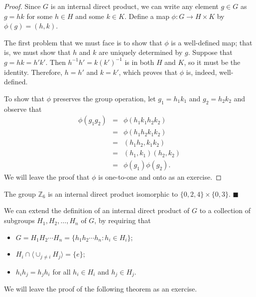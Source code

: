 \begin{proof}
Since $G$ is an internal direct product, we can write any element $g
\in G$ as $g =hk$ for some $h \in H$ and some $k \in K$. Define a map
$\phi : G \rightarrow H \times K$ by $\phi(g) = (h,k)$.

 
The first problem that we must face is to show that $\phi$ is a
well-defined map; that is, we must show that $h$ and $k$ are uniquely
determined by $g$. Suppose that $g = hk=h'k'$. Then $h^{-1} h'= k
(k')^{-1}$ is in both $H$ and $K$, so it must be the identity.
Therefore, $h = h'$ and $k = k'$, which proves that $\phi$ is, indeed,
well-defined. 

 
To show that $\phi$ preserves the group operation, let $g_1 = h_1 k_1$
and $g_2 = h_2 k_2$ and observe that 
\begin{eqnarray*}
\phi( g_1 g_2 ) & = & \phi( h_1 k_1 h_2 k_2 )\\
& = & \phi(h_1  h_2 k_1 k_2) \\
& = & (h_1  h_2, k_1 k_2) \\
& = & (h_1, k_1)( h_2, k_2) \\
& = & \phi( g_1 ) \phi(  g_2 ).
\end{eqnarray*}
We will leave the proof that $\phi$ is one-to-one and onto
as an exercise.
\end{proof}

 
\medskip

 
The group ${\mathbb Z}_6$ is an internal direct product isomorphic to $\{
0, 2, 4\} \times \{ 0, 3 \}$. 
\hspace{\fill} $\blacksquare$

 
\medskip

 
We can extend the definition of an internal direct product of $G$ to a
collection of subgroups $H_1, H_2, \ldots, H_n$ of $G$, by requiring
that 
\begin{itemize}
 
\item
$G = H_1 H_2 \cdots H_n = \{ h_1 h_2 \cdots h_n : h_i \in H_i \}$;
 
\item
$H_i \cap \langle \cup_{j \neq i} H_j \rangle = \{ e \}$;
 
\item
$h_i h_j = h_j h_i$ for all $h_i \in H_i$ and $h_j \in H_j$.
 
\end{itemize}
We will leave the proof of the following theorem as an exercise. 
 
